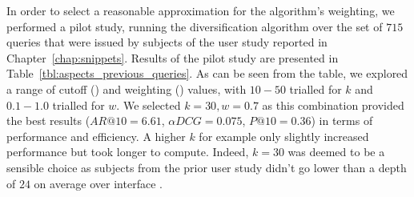 In order to select a reasonable approximation for the algorithm's weighting, we performed a pilot study, running the diversification algorithm over the set of $715$ queries that were issued by subjects of the user study reported in Chapter~\ref{chap:snippets}. Results of the pilot study are presented in Table~\ref{tbl:aspects_previous_queries}. As can be seen from the table, we explored a range of cutoff () and weighting () values, with $10-50$ trialled for $k$ and $0.1-1.0$ trialled for $w$. We selected $k=30, w=0.7$ as this combination provided the best results ($AR@10=6.61$, $\alpha DCG=0.075$, $P@10=0.36$) in terms of performance and efficiency. A higher $k$ for example only slightly increased performance but took longer to compute. Indeed, $k=30$ was deemed to be a sensible choice as subjects from the prior user study didn't go lower than a depth of $24$ on average over interface .

